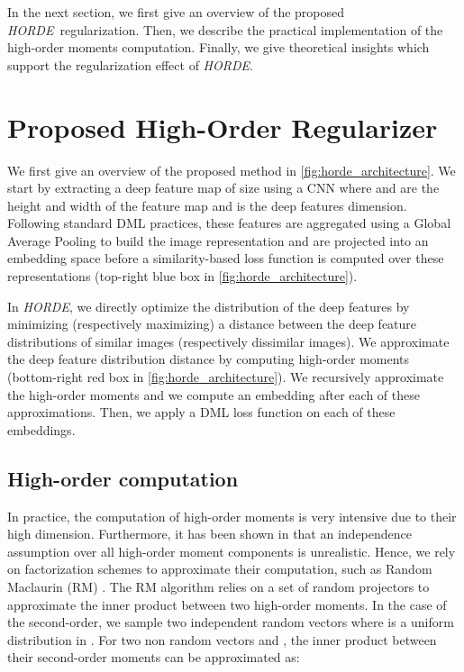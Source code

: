 \documentclass[10pt,twocolumn,letterpaper]{article}
\def\ourmethod{\textit{HORDE}}
\begin{document}
    In the next section, we first give an overview of the proposed \ourmethod \ regularization.
    Then, we describe the practical implementation of the high-order moments computation.
    Finally, we give theoretical insights which support the regularization effect of \ourmethod. 
\section{Proposed High-Order Regularizer}\label{sec:method_overview}
    We first give an overview of the proposed method in \autoref{fig:horde_architecture}.
    We start by extracting a deep feature map of size  using a CNN where  and  are the height and width of the feature map and  is the deep features dimension.
    Following standard DML practices, these features are aggregated using a Global Average Pooling to build the image representation and are projected into an embedding space before a similarity-based loss function is computed over these representations (top-right blue box in \autoref{fig:horde_architecture}).


    In \ourmethod, we directly optimize the distribution of the deep features by minimizing (respectively maximizing) a distance between the deep feature distributions of similar images (respectively dissimilar images).
    We approximate the deep feature distribution distance by computing high-order moments (bottom-right red box in \autoref{fig:horde_architecture}).
    We recursively approximate the high-order moments and we compute an embedding after each of these approximations.
Then, we apply a DML loss function on each of these embeddings.
    


    \subsection{High-order computation}\label{sec:met_implementation}
        In practice, the computation of high-order moments is very intensive due to their high dimension.
        Furthermore, it has been shown in \cite{Jegou_2012_ECCV, Opitz_2017_ICCV} that an independence assumption over all high-order moment components is unrealistic.
        Hence, we rely on factorization schemes to approximate their computation, such as Random Maclaurin (RM) \cite{Kar_PMLR_2012}.
        The RM algorithm relies on a set of random projectors to approximate the inner product between two high-order moments.
        In the case of the second-order, we sample two independent random vectors  where  is a uniform distribution in .
        For two non random vectors  and , the inner product between their second-order moments can be approximated as:
        
\end{document}

